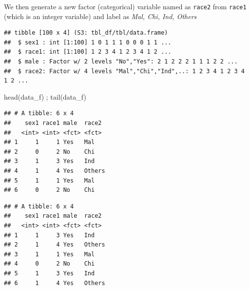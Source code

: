 \documentclass[
]{book}
\makeatletter
\newenvironment{Shaded}{\begin{snugshade}}{\end{snugshade}}
\newcommand{\AttributeTok}[1]{\textcolor[rgb]{0.61,0.61,0.61}{#1}}
\newcommand{\FunctionTok}[1]{\textcolor[rgb]{0,0,0}{#1}}
\newcommand{\NormalTok}[1]{#1}
\newcommand{\OtherTok}[1]{\textcolor[rgb]{0.37,0.37,0.37}{#1}}
\newcommand{\SpecialCharTok}[1]{\textcolor[rgb]{0,0,0}{#1}}
\newcommand{\StringTok}[1]{\textcolor[rgb]{0.5,0.5,0.5}{#1}}
\newenvironment{kframe}{%
\medskip{}
\setlength{\fboxsep}{.8em}
 \def\at@end@of@kframe{}%
 \ifinner\ifhmode%
  \def\at@end@of@kframe{\end{minipage}}%
  \begin{minipage}{\columnwidth}%
 \fi\fi%
 \def\FrameCommand##1{\hskip\@totalleftmargin \hskip-\fboxsep
 \colorbox{shadecolor}{##1}\hskip-\fboxsep
     \hskip-\linewidth \hskip-\@totalleftmargin \hskip\columnwidth}%
 \MakeFramed {\advance\hsize-\width
   \@totalleftmargin\z@ \linewidth\hsize
   \@setminipage}}%
 {\par\unskip\endMakeFramed%
 \at@end@of@kframe}
\renewenvironment{Shaded}{\begin{kframe}}{\end{kframe}}
\makeatother
\begin{document}
We then generate a new factor (categorical) variable named as \texttt{race2} from \texttt{race1} (which is an integer variable) and label as \emph{Mal, Chi, Ind, Others}

\begin{Shaded}
\end{Shaded}

\begin{verbatim}
## tibble [100 x 4] (S3: tbl_df/tbl/data.frame)
##  $ sex1 : int [1:100] 1 0 1 1 1 0 0 0 1 1 ...
##  $ race1: int [1:100] 1 2 3 4 1 2 3 4 1 2 ...
##  $ male : Factor w/ 2 levels "No","Yes": 2 1 2 2 2 1 1 1 2 2 ...
##  $ race2: Factor w/ 4 levels "Mal","Chi","Ind",..: 1 2 3 4 1 2 3 4 1 2 ...
\end{verbatim}

\begin{Shaded}
\begin{Highlighting}[]
\FunctionTok{head}\NormalTok{(data\_f) ; }\FunctionTok{tail}\NormalTok{(data\_f)}
\end{Highlighting}
\end{Shaded}

\begin{verbatim}
## # A tibble: 6 x 4
##    sex1 race1 male  race2 
##   <int> <int> <fct> <fct> 
## 1     1     1 Yes   Mal   
## 2     0     2 No    Chi   
## 3     1     3 Yes   Ind   
## 4     1     4 Yes   Others
## 5     1     1 Yes   Mal   
## 6     0     2 No    Chi
\end{verbatim}

\begin{verbatim}
## # A tibble: 6 x 4
##    sex1 race1 male  race2 
##   <int> <int> <fct> <fct> 
## 1     1     3 Yes   Ind   
## 2     1     4 Yes   Others
## 3     1     1 Yes   Mal   
## 4     0     2 No    Chi   
## 5     1     3 Yes   Ind   
## 6     1     4 Yes   Others
\end{verbatim}
\end{document}
